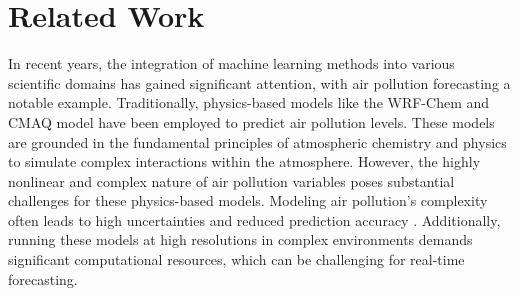 \section{Related Work}
\label{related_work}

In recent years, the integration of machine learning methods into various scientific domains has gained significant attention, with air pollution forecasting a notable example. 
Traditionally, physics-based models like the WRF-Chem \citep{ojha2020widespread} and CMAQ \citep{zhang2012source} model have been employed to predict air pollution levels. 
These models are grounded in the fundamental principles of atmospheric chemistry and physics to simulate complex interactions within the atmosphere.
However, the highly nonlinear and complex nature of air pollution variables poses substantial challenges for these physics-based models. 
Modeling air pollution's complexity often leads to high uncertainties and reduced prediction accuracy \citep{hao2020spatiotemporal, li2019air}. 
Additionally, running these models at high resolutions in complex environments demands significant computational resources, which can be challenging for real-time forecasting.

